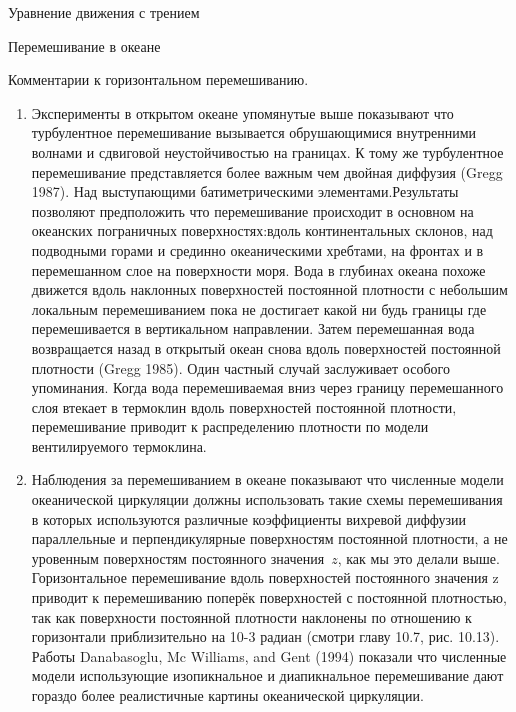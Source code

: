 \begin{chapter}{Уравнение движения с трением}
\begin{section}{Перемешивание в океане}
\begin{paragraph}{Комментарии к горизонтальном перемешиванию.}
\begin{enumerate}
\item
Эксперименты в открытом океане упомянутые выше показывают что
турбулентное перемешивание вызывается обрушающимися внутренними
волнами и сдвиговой неустойчивостью на границах. К тому же
турбулентное перемешивание представляется более важным чем двойная
диффузия (Gregg 1987). Над выступающими батиметрическими
элементами.Результаты позволяют предположить что перемешивание
происходит в основном на океанских пограничных поверхностях:вдоль
континентальных склонов, над подводными горами и срединно
океаническими хребтами, на фронтах и в перемешанном слое на
поверхности моря. Вода в глубинах океана похоже движется вдоль
наклонных поверхностей постоянной плотности с небольшим локальным
перемешиванием пока не достигает какой ни будь границы где
перемешивается в вертикальном направлении. Затем перемешанная вода
возвращается назад в открытый океан снова вдоль поверхностей
постоянной плотности (Gregg 1985). Один частный случай заслуживает
особого упоминания. Когда вода перемешиваемая вниз через границу
перемешанного слоя втекает в термоклин вдоль поверхностей постоянной
плотности, перемешивание приводит к распределению плотности по модели
вентилируемого термоклина.

\item
Наблюдения за перемешиванием в океане показывают что численные модели
океанической циркуляции должны использовать такие схемы перемешивания
в которых используются различные коэффициенты вихревой диффузии
параллельные и перпендикулярные поверхностям постоянной плотности, а
не уровенным поверхностям постоянного значения~$z$, как мы это делали
выше. Горизонтальное перемешивание вдоль поверхностей постоянного
значения z приводит к перемешиванию поперёк поверхностей с постоянной
плотностью, так как поверхности постоянной плотности наклонены по
отношению к горизонтали приблизительно на 10-3 радиан (смотри главу
10.7, рис. 10.13). Работы Danabasoglu, Mc Williams, and Gent (1994)
показали что численные модели использующие изопикнальное и
диапикнальное перемешивание дают гораздо более реалистичные картины
океанической циркуляции.


\end{enumerate}
\end{paragraph}
\end{section}
\end{chapter}
